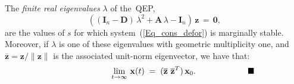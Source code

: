 \documentclass[letterpaper,9pt,twocolumn]{autart}
\newcommand{\vet}[1]{\ensuremath{{\mathbf #1}}}
\begin{document}
\begin{proposition}\label{Prop_Main}
The \emph{finite real eigenvalues} $\lambda$ of the~QEP,
\begin{equation}\label{Eq:QEP:me}
((\vet{I}_n - \vet{D})\,\lambda^2 + \vet{A}\,\lambda - \vet{I}_n)\,\vet{z} \,=\, \vet{0},
\end{equation}
are the values of $s$ for which system~(\ref{Eq_cons_defor}) is marginally stable. Moreover, if
$\lambda$ is one of these eigenvalues with geometric
multiplicity one, and $\overline{\vet{z}} = \vet{z}/\|\vet{z}\|$ is the associated
unit-norm eigenvector, we have that:
$$
\hspace{2.4cm}\lim_{t \rightarrow \infty}\,\vet{x}(t) \;=\; (\overline{\vet{z}}\,\,\overline{\vet{z}}^T)\,\vet{x}_0.
\hspace{2.2cm}\hfill\blacksquare
$$
\end{proposition}
\end{document}
